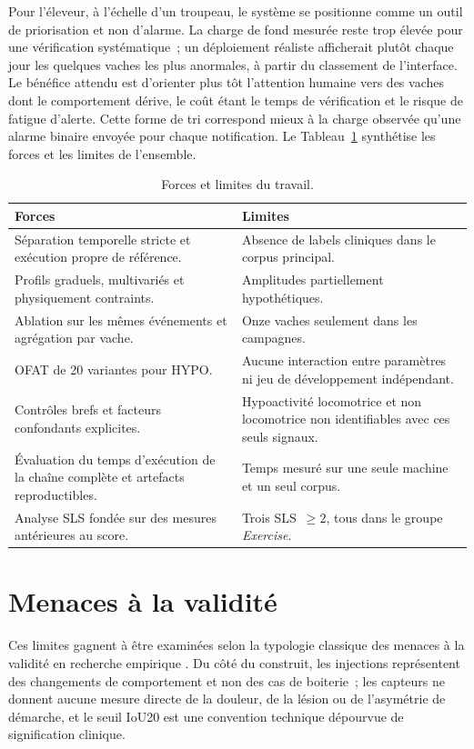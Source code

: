 Pour l'éleveur, à l'échelle d'un troupeau, le système se positionne comme un outil de
priorisation et non d'alarme. La charge de fond mesurée reste trop élevée pour une
vérification systématique~; un déploiement réaliste afficherait plutôt chaque jour les
quelques vaches les plus anormales, à partir du classement de l'interface. Le bénéfice attendu
est d'orienter plus tôt l'attention humaine vers des vaches dont le comportement dérive, le
coût étant le temps de vérification et le risque de fatigue d'alerte. Cette forme de tri
correspond mieux à la charge observée qu'une alarme binaire envoyée pour chaque notification.
Le Tableau~\ref{tab:forces_limites} synthétise les forces et les limites de l'ensemble.

\begin{table}[H]
  \centering
  \caption{Forces et limites du travail.}
  \label{tab:forces_limites}
  \small
  \begin{tabular}{p{}p{}}
    \toprule
    Forces & Limites \\
    \midrule
    Séparation temporelle stricte et exécution propre de référence.
      & Absence de labels cliniques dans le corpus principal. \\
    Profils graduels, multivariés et physiquement contraints.
      & Amplitudes partiellement hypothétiques. \\
    Ablation sur les mêmes événements et agrégation par vache.
      & Onze vaches seulement dans les campagnes. \\
    OFAT de 20 variantes pour HYPO.
      & Aucune interaction entre paramètres ni jeu de développement indépendant. \\
    Contrôles brefs et facteurs confondants explicites.
      & Hypoactivité locomotrice et non locomotrice non identifiables avec ces seuls signaux. \\
    Évaluation du temps d'exécution de la chaîne complète et artefacts reproductibles.
      & Temps mesuré sur une seule machine et un seul corpus. \\
    Analyse SLS fondée sur des mesures antérieures au score.
      & Trois SLS~$\geq2$, tous dans le groupe \textit{Exercise}. \\
    \bottomrule
  \end{tabular}
\end{table}

\section{Menaces à la validité}
Ces limites gagnent à être examinées selon la typologie classique des menaces à la validité en
recherche empirique \citep{shadish2002experimental,wohlin2012experimentation}. Du côté du
construit, les injections représentent des changements de comportement et non des cas de
boiterie~; les capteurs ne donnent aucune mesure directe de la douleur, de la lésion ou de
l'asymétrie de démarche, et le seuil IoU20 est une convention technique dépourvue de signification clinique.

